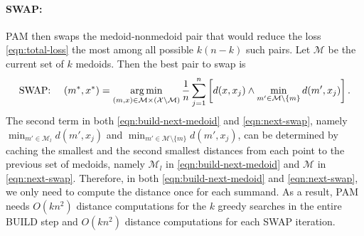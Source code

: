 \paragraph{SWAP:} PAM then swaps the medoid-nonmedoid pair that would reduce the loss \eqref{eqn:total-loss} the most among all possible $k(n-k)$  such pairs.
Let $\mathcal{M}$ be the current set of $k$ medoids. Then the best pair to swap is
\begin{equation}
\label{eqn:next-swap}
    \text{SWAP:~~~~}(m^*, x^*) = \operatorname*{arg\,min}_{(m,x) \in \mathcal{M} \times (\mathcal{X} \setminus \mathcal{M}) } \frac{1}{n} \sum_{j=1}^n \left[d(x, x_j) \wedge \min_{m' \in \mathcal{M}\setminus \{m\}} d(m', x_j) \right]. 
\end{equation}
The second term in both \eqref{eqn:build-next-medoid} and \eqref{eqn:next-swap}, namely $\min_{m' \in \mathcal{M}_{l}} d(m', x_j)$ and $\min_{m' \in \mathcal{M}\setminus \{m\}} d(m', x_j)$, can be determined by caching the smallest and the second smallest distances from each point to the previous set of medoids, namely $\mathcal{M}_{l}$ in \eqref{eqn:build-next-medoid} and $\mathcal{M}$ in \eqref{eqn:next-swap}.
Therefore, in both \eqref{eqn:build-next-medoid} and \eqref{eqn:next-swap}, we only need to compute the distance once for each summand.
As a result, PAM needs $O(kn^2)$ distance computations for the $k$ greedy searches in the entire BUILD step and $O(kn^2)$ distance computations for each SWAP iteration.


